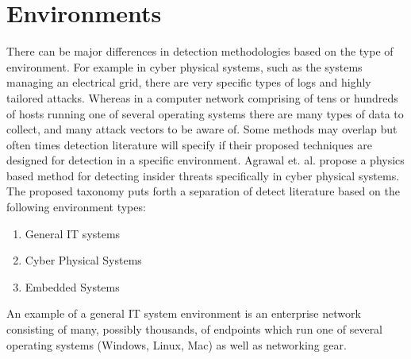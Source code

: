 \section{Environments}
 There can be major differences in detection methodologies based on the type of environment. 
 For example in cyber physical systems, such as the systems managing an electrical grid, there are very specific types of logs and highly tailored attacks. 
 Whereas in a computer network comprising of tens or hundreds of hosts running one of several operating systems there are many types of data to collect, and many attack vectors to be aware of. 
 Some methods may overlap but often times detection literature will specify if their proposed techniques are designed for detection in a specific environment. 
 Agrawal et. al. propose a physics based method for detecting insider threats specifically in cyber physical systems\cite{agrawal2018poster}.
The proposed taxonomy puts forth a separation of detect literature based on the following environment types: 
\begin{enumerate}
    \item General IT systems
    \item Cyber Physical Systems
    \item Embedded Systems
\end{enumerate}
An example of a general IT system environment is an enterprise network consisting of many, possibly thousands, of endpoints which run one of several operating systems (Windows, Linux, Mac) as well as networking gear. 

